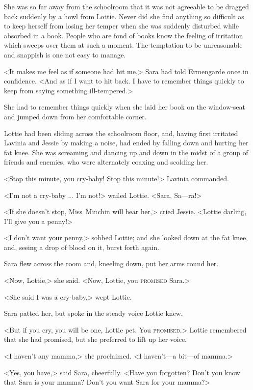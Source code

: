 She was so far away from the schoolroom that it was not agreeable to be dragged back suddenly by a howl from Lottie. Never did she find anything so difficult as to keep herself from losing her temper when she was suddenly disturbed while absorbed in a book. People who are fond of books know the feeling of irritation which sweeps over them at such a moment. The temptation to be unreasonable and snappish is one not easy to manage.

<It makes me feel as if someone had hit me,> Sara had told Ermengarde once in confidence. <And as if I want to hit back. I have to remember things quickly to keep from saying something ill-tempered.>

She had to remember things quickly when she laid her book on the window-seat and jumped down from her comfortable corner.

Lottie had been sliding across the schoolroom floor, and, having first irritated Lavinia and Jessie by making a noise, had ended by falling down and hurting her fat knee. She was screaming and dancing up and down in the midst of a group of friends and enemies, who were alternately coaxing and scolding her.

<Stop this minute, you cry-baby! Stop this minute!> Lavinia commanded.

<I'm not a cry-baby ... I'm not!> wailed Lottie. <Sara, Sa—ra!>

<If she doesn't stop, Miss~Minchin will hear her,> cried Jessie. <Lottie darling, I'll give you a penny!>

<I don't want your penny,> sobbed Lottie; and she looked down at the fat knee, and, seeing a drop of blood on it, burst forth again.

Sara flew across the room and, kneeling down, put her arms round her.

<Now, Lottie,> she said. <Now, Lottie, you \textsc{promised} Sara.>

<She said I was a cry-baby,> wept Lottie.

Sara patted her, but spoke in the steady voice Lottie knew.

<But if you cry, you will be one, Lottie pet. You \textsc{promised}.> Lottie remembered that she had promised, but she preferred to lift up her voice.

<I haven't any mamma,> she proclaimed. <I haven't—a bit—of mamma.>

<Yes, you have,> said Sara, cheerfully. <Have you forgotten? Don't you know that Sara is your mamma? Don't you want Sara for your mamma?>

